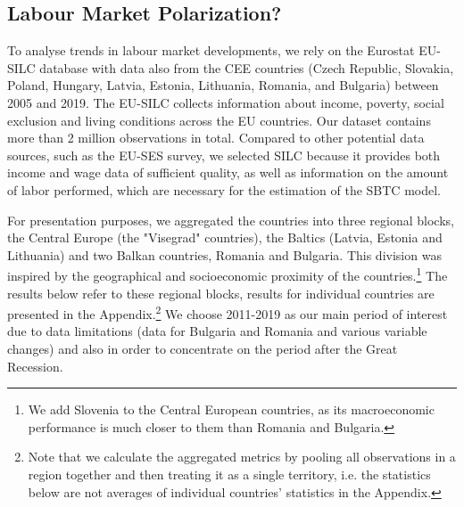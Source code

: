 \documentclass[11pt]{article}
\begin{document}
\subsection{Labour Market Polarization?}\label{wage_analysis}
To analyse trends in labour market developments, we rely on the Eurostat EU-SILC database with data also from the CEE countries (Czech Republic, Slovakia, Poland, Hungary, Latvia, Estonia, Lithuania, Romania, and Bulgaria) between 2005 and 2019. The EU-SILC collects information about income, poverty, social exclusion and living conditions across the EU countries. Our dataset contains more than 2 million observations in total.
Compared to other potential data sources, such as the EU-SES survey, we selected SILC because it provides both income and wage data of sufficient quality, as well as information on the amount of labor performed, which are necessary for the estimation of the SBTC model. 

For presentation purposes, we aggregated the countries into three regional blocks, the Central Europe (the "Visegrad" countries), the Baltics (Latvia, Estonia and Lithuania) and two Balkan countries, Romania and Bulgaria. This division was inspired by the geographical and socioeconomic proximity of the countries.\footnote{We add Slovenia to the Central European countries, as its macroeconomic performance is much closer to them than Romania and Bulgaria.} The results below refer to these regional blocks, results for individual countries are presented in the Appendix.\footnote{Note that we calculate the aggregated metrics by pooling all observations in a region together and then treating it as a single territory, i.e. the statistics below are not averages of individual countries' statistics in the Appendix.} We choose 2011-2019 as our main period of interest due to data limitations (data for Bulgaria and Romania and various variable changes) and also in order to concentrate on the period after the Great Recession.
\end{document}
